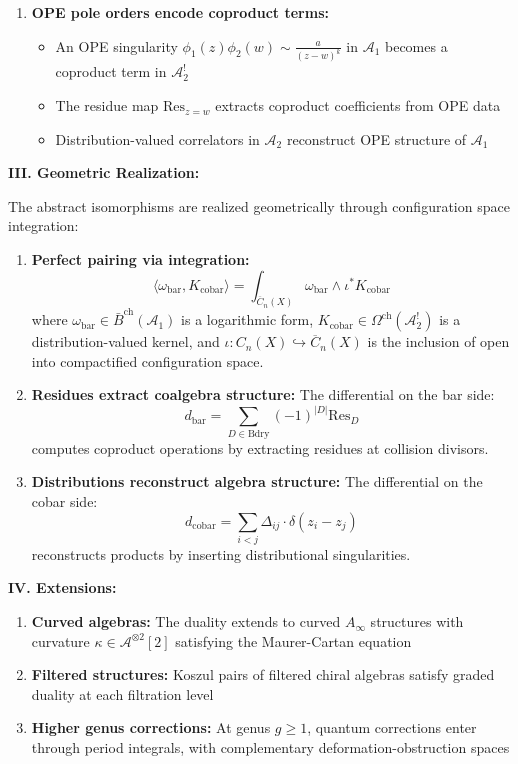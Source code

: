 \begin{theorem}
\begin{enumerate}
\item \textbf{OPE pole orders encode coproduct terms:}
   \begin{itemize}
   \item An OPE singularity $\phi_1(z)\phi_2(w) \sim \frac{a}{(z-w)^k}$ in $\mathcal{A}_1$ becomes a coproduct term in $\mathcal{A}_2^!$
   \item The residue map $\text{Res}_{z=w}$ extracts coproduct coefficients from OPE data
   \item Distribution-valued correlators in $\mathcal{A}_2$ reconstruct OPE structure of $\mathcal{A}_1$
   \end{itemize}
\end{enumerate}

\medskip
\noindent\textbf{III. Geometric Realization:}

The abstract isomorphisms are realized geometrically through configuration space integration:

\begin{enumerate}
\item \textbf{Perfect pairing via integration:}
   $$\langle \omega_{\text{bar}}, K_{\text{cobar}} \rangle = \int_{\overline{C}_n(X)} \omega_{\text{bar}} \wedge \iota^* K_{\text{cobar}}$$
   where $\omega_{\text{bar}} \in \bar{B}^{\text{ch}}(\mathcal{A}_1)$ is a logarithmic form, $K_{\text{cobar}} \in \Omega^{\text{ch}}(\mathcal{A}_2^!)$ is a distribution-valued kernel, and $\iota: C_n(X) \hookrightarrow \overline{C}_n(X)$ is the inclusion of open into compactified configuration space.

\item \textbf{Residues extract coalgebra structure:}
   The differential on the bar side:
   $$d_{\text{bar}} = \sum_{D \in \text{Bdry}} (-1)^{|D|} \text{Res}_D$$
   computes coproduct operations by extracting residues at collision divisors.

\item \textbf{Distributions reconstruct algebra structure:}
   The differential on the cobar side:
   $$d_{\text{cobar}} = \sum_{i<j} \Delta_{ij} \cdot \delta(z_i - z_j)$$
   reconstructs products by inserting distributional singularities.
\end{enumerate}

\medskip
\noindent\textbf{IV. Extensions:}
\begin{enumerate}
\item \textbf{Curved algebras:} The duality extends to curved $A_\infty$ structures with curvature $\kappa \in \mathcal{A}^{\otimes 2}[2]$ satisfying the Maurer-Cartan equation

\item \textbf{Filtered structures:} Koszul pairs of filtered chiral algebras satisfy graded duality at each filtration level

\item \textbf{Higher genus corrections:} At genus $g \geq 1$, quantum corrections enter through period integrals, with complementary deformation-obstruction spaces
\end{enumerate}
\end{theorem}


